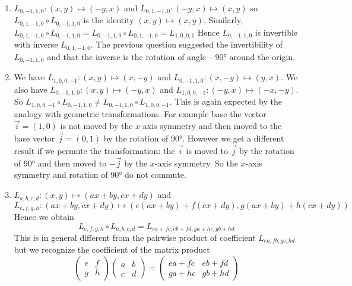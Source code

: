 \begin{enumerate}
\begin{center}
\end{center}

\item
  $L_{0,-1,1,0}: (x,y) \mapsto (-y,x)$ and
  $L_{0,1,-1,0}: (-y,x) \mapsto (x,y)$ so $L_{0,1,-1,0} \circ L_{0,-1,1,0}$ is
  the identity $(x,y) \mapsto (x,y)$. Similarly,
  $L_{0,1,-1,0} \circ L_{0,-1,1,0} = L_{0,-1,1,0} \circ L_{0,1,-1,0} = L_{1,0,0,1}$
  Hence $L_{0,-1,1,0}$ is invertible with inverse
  $L_{0,1,-1,0}$. The previous question suggested the invertibility of
  $L_{0,-1,1,0}$ and that
  the inverse is the rotation of angle $-90°$ around the origin.

\item
  We have $L_{1,0,0,-1}: (x,y) \mapsto (x,-y)$
  and $L_{0,-1,1,0}: (x,-y) \mapsto (y,x)$.
  We also have $L_{0,-1,1,0}: (x,y) \mapsto (-y,x)$ and
  $L_{1,0,0,-1}: (-y,x) \mapsto (-x,-y)$.
  So $L_{1,0,0,-1} \circ L_{0,-1,1,0} \neq L_{0,-1,1,0} \circ L_{1,0,0,-1}$.
  This is again expected by the analogy with geometric transformations.
  For example base the vector $\vec{i}=(1,0)$ is not moved by the $x$-axis
  symmetry and then moved to the base vector $\vec{j}=(0,1)$ by the rotation of
  90°. However we get a different result if we permute the transformation:
  the $\vec{i}$ is moved to $\vec{j}$ by the rotation of 90° and
  then moved to $-\vec{j}$ by the $x$-axis symmetry. So the $x$-axis symmetry
  and rotation of 90° do not commute.
\item
  $L_{a,b,c,d}: (x,y) \mapsto {(ax+by,cx+dy)}$
  and $$L_{e,f,g,h}: {(ax+by,cx+dy)} \mapsto
  {({e(ax+by)+f(cx+dy)}, {g(ax+by)+h(cx+dy)})}$$
  Hence we obtain
  $$L_{e,f,g,h} \circ L_{a,b,c,d} = L_{ea+fc,eb+fd,ga+hc,gb+hd}$$
  This is in general different from the pairwise
  product of coefficient $L_{ea,fb,gc,hd}$ but we recognize the coefficient
  of the matrix product
  $$
  \begin{pmatrix}
       e & f \\
       g & h
  \end{pmatrix}
  \begin{pmatrix}
       a & b \\
       c & d
  \end{pmatrix} =
  \begin{pmatrix}
       ea+fc & eb+fd \\
       ga+hc & gb+hd
  \end{pmatrix}
$$
\end{enumerate}

